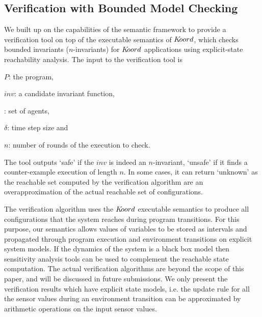 \subsection{Verification with Bounded Model Checking}
\label{sec:bmc}


We built up on the capabilities of the \K semantic framework to provide a verification tool on top of the executable semantics of $K\kern-2pt oord$, which checks bounded invariants ($n$-invariants) for $K\kern-2pt oord$ applications using explicit-state reachability analysis. The input to the verification tool is 
\begin{inparaenum}[(i)] 
    \item $P$: the program, 
    \item $\mathit{inv}$: a candidate invariant function, 
    \item {\UINS}: set of agents, 
    \item $\delta$: time step size and 
    \item $n$: number of rounds of the execution to check.
\end{inparaenum}

The tool outputs `safe' if the $\mathit{inv}$ is indeed an $n$-invariant, `unsafe' if it finds a counter-example execution of length $n$. In some cases, it can return `unknown' as the reachable set computed by the verification algorithm are an overapproximation of the actual reachable set of configurations.  

The verification algorithm uses the $K\kern-2pt oord$ executable semantics to produce all configurations that the system reaches during program transitions. For this purpose, our semantics allows values of variables to be stored as intervals and propagated through program execution and environment transitions on explicit system models. If the dynamics of the system is a black box model then sensitivity analysis tools can be used to complement the reachable state computation. The actual verification algorithms are beyond the scope of this paper, and will be discussed in future submissions. We only present the verification results which have explicit state models, i.e. the update rule for all the sensor values during an environment transition can be approximated by arithmetic operations on the input sensor values. 

